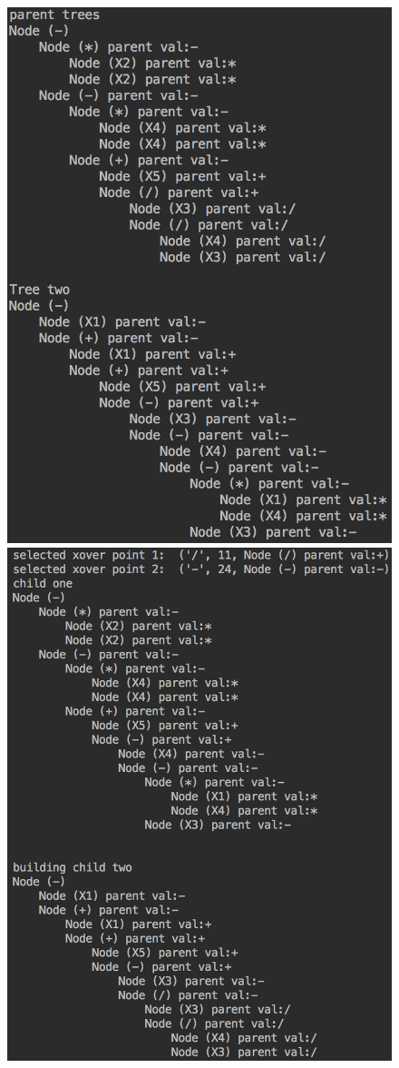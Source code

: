 \documentclass[11pt]{article}
\begin{document}
\begin{figure}[h]
\centering
\includegraphics[scale = .60]{2}
\includegraphics[scale = .60]{3}
\end{figure}
\end{document}
